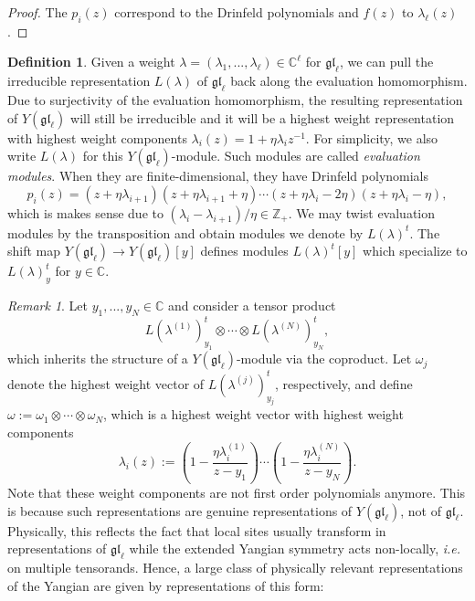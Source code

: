 \documentclass[11pt]{report}
\theoremstyle{definition}
\newtheorem{definition}[theorem]{Definition}
\theoremstyle{remark}
\newtheorem*{remark}{Remark}
\theoremstyle{remark}
\newcommand{\Z}{\mathbb{Z}}
\newcommand{\C}{\mathbb{C}}
\begin{document}
\begin{proof}
The $p_i(z)$ correspond to the Drinfeld polynomials and $f(z)$ to $\lambda_\ell(z)$.
\end{proof}

\begin{definition}
Given a weight $\lambda = (\lambda_1,...,\lambda_\ell) \in \C^\ell$ for $\mathfrak{gl}_\ell$, we can pull the irreducible representation $L(\lambda)$ of $\mathfrak{gl}_\ell$ back along the evaluation homomorphism. Due to surjectivity of the evaluation homomorphism, the resulting representation of $Y(\mathfrak{gl}_\ell)$ will still be irreducible and it will be a highest weight representation with highest weight components $\lambda_i(z) = 1 + \eta \lambda_i z^{-1}$. For simplicity, we also write $L(\lambda)$ for this $Y(\mathfrak{gl}_\ell)$-module. Such modules are called \emph{evaluation modules}. When they are finite-dimensional, they have Drinfeld polynomials
\begin{equation*}
p_i(z) = (z+\eta \lambda_{i+1})(z+\eta \lambda_{i+1}+\eta) \cdots (z+\eta \lambda_i-2\eta)(z+\eta \lambda_i-\eta),
\end{equation*}
which is makes sense due to $(\lambda_i - \lambda_{i+1})/\eta \in \Z_+$. We may twist evaluation modules by the transposition and obtain modules we denote by $L(\lambda)^t$. The shift map $Y(\mathfrak{gl}_\ell) \to Y(\mathfrak{gl}_\ell)[y]$ defines modules $L(\lambda)^t[y]$ which specialize to $L(\lambda)_y^t$ for $y \in \C$.
\end{definition}

\begin{remark}
Let $y_1,...,y_N \in \C$ and consider a tensor product
\begin{equation*}
L(\lambda^{(1)})_{y_1}^t \otimes \cdots \otimes L(\lambda^{(N)})_{y_N}^t,
\end{equation*}
which inherits the structure of a $Y(\mathfrak{gl}_\ell)$-module via the coproduct. Let $\omega_j$ denote the highest weight vector of $L(\lambda^{(j)})_{y_j}^t$, respectively, and define $\omega := \omega_1 \otimes \cdots \otimes \omega_N$, which is a highest weight vector with highest weight components
\begin{equation*}
\lambda_i(z) := \left( 1 - \frac{\eta \lambda_i^{(1)}}{z-y_1} \right) \cdots \left( 1 - \frac{\eta \lambda_i^{(N)}}{z-y_N} \right).
\end{equation*}
Note that these weight components are not first order polynomials anymore. This is because such representations are genuine representations of $Y(\mathfrak{gl}_\ell)$, not of $\mathfrak{gl}_\ell$. Physically, this reflects the fact that local sites usually transform in representations of $\mathfrak{gl}_\ell$ while the extended Yangian symmetry acts non-locally, \emph{i.e.} on multiple tensorands. Hence, a large class of physically relevant representations of the Yangian are given by representations of this form:
\end{remark}
\end{document}

